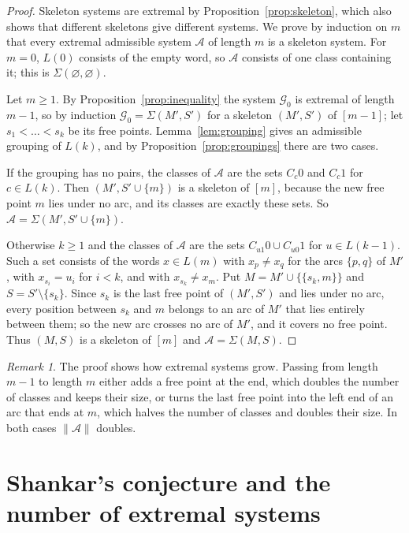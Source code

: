 \documentclass[11pt]{amsart}
\theoremstyle{definition}
\theoremstyle{remark}
\newtheorem{remark}[theorem]{Remark}
\numberwithin{equation}{section}
\newcommand{\cA}{\mathcal{A}}
\newcommand{\cG}{\mathcal{G}}
\begin{document}
\begin{proof}
Skeleton systems are extremal by Proposition~\ref{prop:skeleton}, which also shows that different skeletons give different systems. We prove by induction on $m$ that every extremal admissible system $\cA$ of length $m$ is a skeleton system. For $m=0$, $L(0)$ consists of the empty word, so $\cA$ consists of one class containing it; this is $\Sigma(\varnothing,\varnothing)$.

Let $m\ge1$. By Proposition~\ref{prop:inequality} the system $\cG_0$ is extremal of length $m-1$, so by induction $\cG_0=\Sigma(M',S')$ for a skeleton $(M',S')$ of $[m-1]$; let $s_1<\dots<s_k$ be its free points. Lemma~\ref{lem:grouping} gives an admissible grouping of $L(k)$, and by Proposition~\ref{prop:groupings} there are two cases.

If the grouping has no pairs, the classes of $\cA$ are the sets $C_c0$ and $C_c1$ for $c\in L(k)$. Then $(M',S'\cup\{m\})$ is a skeleton of $[m]$, because the new free point $m$ lies under no arc, and its classes are exactly these sets. So $\cA=\Sigma(M',S'\cup\{m\})$.

Otherwise $k\ge1$ and the classes of $\cA$ are the sets $C_{u1}0\cup C_{u0}1$ for $u\in L(k-1)$. Such a set consists of the words $x\in L(m)$ with $x_p\ne x_q$ for the arcs $\{p,q\}$ of $M'$, with $x_{s_i}=u_i$ for $i<k$, and with $x_{s_k}\ne x_m$. Put $M=M'\cup\{\{s_k,m\}\}$ and $S=S'\setminus\{s_k\}$. Since $s_k$ is the last free point of $(M',S')$ and lies under no arc, every position between $s_k$ and $m$ belongs to an arc of $M'$ that lies entirely between them; so the new arc crosses no arc of $M'$, and it covers no free point. Thus $(M,S)$ is a skeleton of $[m]$ and $\cA=\Sigma(M,S)$.
\end{proof}

\begin{remark}\label{rem:growth}
The proof shows how extremal systems grow. Passing from length $m-1$ to length $m$ either adds a free point at the end, which doubles the number of classes and keeps their size, or turns the last free point into the left end of an arc that ends at $m$, which halves the number of classes and doubles their size. In both cases $\|\cA\|$ doubles.
\end{remark}

\section{Shankar's conjecture and the number of extremal systems}\label{sec:count}
\end{document}
